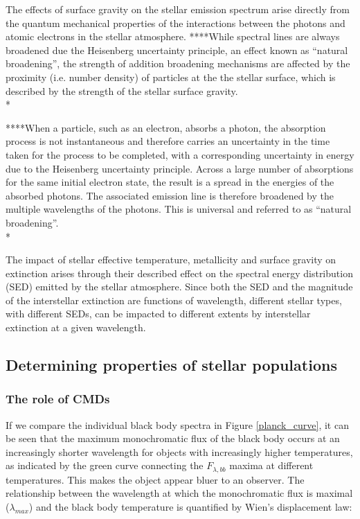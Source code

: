 \documentclass[12pt, a4paper]{report}
\begin{document}
The effects of surface gravity on the stellar emission spectrum arise directly from the quantum mechanical properties of the interactions between the photons and atomic electrons in the stellar atmosphere. ****While spectral lines are always broadened due the Heisenberg uncertainty principle, an effect known as ``natural broadening'', the strength of addition broadening mechanisms are affected by the proximity (i.e. number density) of particles at the the stellar surface, which is described by the strength of the stellar surface gravity. \\*

****When a particle, such as an electron, absorbs a photon, the absorption process is not instantaneous and therefore carries an uncertainty in the time taken for the process to be completed, with a corresponding uncertainty in energy due to the Heisenberg uncertainty principle. Across a large number of absorptions for the same initial electron state, the result is a spread in the energies of the absorbed photons. The associated emission line is therefore broadened by the multiple wavelengths of the photons. This is universal and referred to as ``natural broadening''.\\*

The impact of stellar effective temperature, metallicity and surface gravity on extinction arises through their described effect on the spectral energy distribution (SED) emitted by the stellar atmosphere. Since both the SED and the magnitude of the interstellar extinction are functions of wavelength, different stellar types, with different SEDs, can be impacted to different extents by interstellar extinction at a given wavelength.

\subsection{Determining properties of stellar populations}
\subsubsection{The role of CMDs} \label{CMDs_intro}
If we compare the individual black body spectra in Figure \ref{planck_curve}, it can be seen that the maximum monochromatic flux of the black body occurs at an increasingly shorter wavelength for objects with increasingly higher temperatures, as indicated by the green curve connecting the $F_{\lambda,bb}$ maxima at different temperatures. This makes the object appear bluer to an observer. The relationship between the wavelength at which the monochromatic flux is maximal ($\lambda_{max}$) and the black body temperature is quantified by Wien's displacement law:
\end{document}
